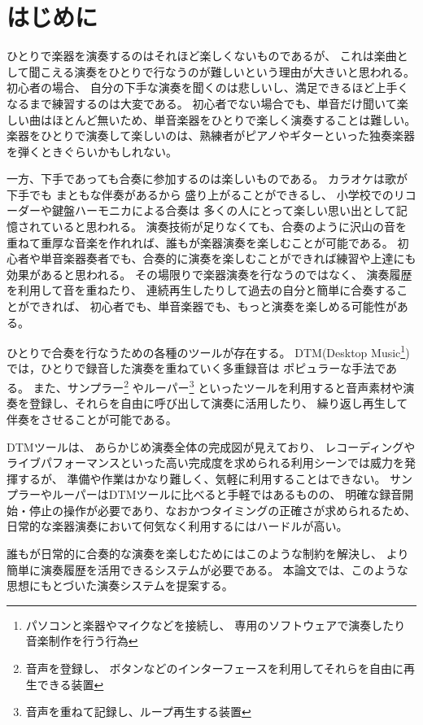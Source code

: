 %
%
\section{はじめに}
\label{sec:start}

ひとりで楽器を演奏するのはそれほど楽しくないものであるが、
これは楽曲として聞こえる演奏をひとりで行なうのが難しいという理由が大きいと思われる。
%
初心者の場合、 自分の下手な演奏を聞くのは悲しいし、満足できるほど上手くなるまで練習するのは大変である。
初心者でない場合でも、単音だけ聞いて楽しい曲はほとんど無いため、単音楽器をひとりで楽しく演奏することは難しい。
楽器をひとりで演奏して楽しいのは、熟練者がピアノやギターといった独奏楽器を弾くときぐらいかもしれない。

一方、下手であっても合奏に参加するのは楽しいものである。
カラオケは歌が下手でも
まともな伴奏があるから
盛り上がることができるし、
小学校でのリコーダーや鍵盤ハーモニカによる合奏は
多くの人にとって楽しい思い出として記憶されていると思われる。
演奏技術が足りなくても、合奏のように沢山の音を重ねて重厚な音楽を作れれば、誰もが楽器演奏を楽しむことが可能である。
初心者や単音楽器奏者でも、合奏的に演奏を楽しむことができれば練習や上達にも効果があると思われる。
%
その場限りで楽器演奏を行なうのではなく、
演奏履歴を利用して音を重ねたり、
連続再生したりして過去の自分と簡単に合奏することができれば、
初心者でも、単音楽器でも、もっと演奏を楽しめる可能性がある。

ひとりで合奏を行なうための各種のツールが存在する。
%
DTM(Desktop Music\footnote{パソコンと楽器やマイクなどを接続し、
    専用のソフトウェアで演奏したり音楽制作を行う行為})
では，ひとりで録音した演奏を重ねていく多重録音は
ポピュラーな手法である\cite{jacob}\cite{resound}。
%
%
また、サンプラー\footnote{音声を登録し、
    ボタンなどのインターフェースを利用してそれらを自由に再生できる装置}
やルーパー\footnote{音声を重ねて記録し、ループ再生する装置}
といったツールを利用すると音声素材や演奏を登録し、それらを自由に呼び出して演奏に活用したり、
繰り返し再生して伴奏をさせることが可能である。

DTMツールは、
あらかじめ演奏全体の完成図が見えており、
レコーディングやライブパフォーマンスといった高い完成度を求められる利用シーンでは威力を発揮するが、
準備や作業はかなり難しく、気軽に利用することはできない。
%
サンプラーやルーパーはDTMツールに比べると手軽ではあるものの、
明確な録音開始・停止の操作が必要であり、なおかつタイミングの正確さが求められるため、
日常的な楽器演奏において何気なく利用するにはハードルが高い。

誰もが日常的に合奏的な演奏を楽しむためにはこのような制約を解決し、
より簡単に演奏履歴を活用できるシステムが必要である。
本論文では、このような思想にもとづいた演奏システム{\system}を提案する。
